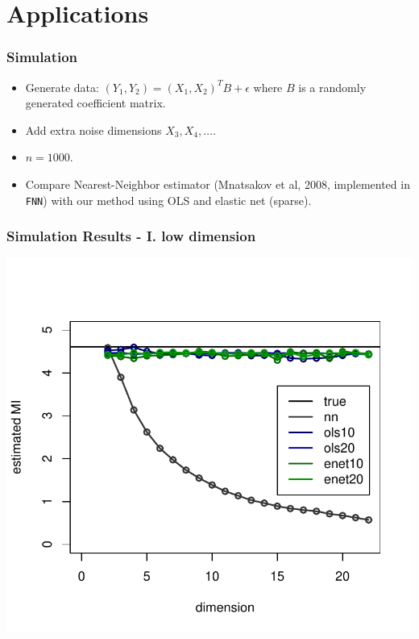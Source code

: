 \documentclass{beamer}
\begin{document}
\section{Applications}

\begin{frame}
\sectionpage
\end{frame}

\begin{frame}
\frametitle{Simulation}

\begin{itemize}
\item Generate data: $(Y_1, Y_2) = (X_1, X_2)^T B + \epsilon$ where $B$ is a randomly generated coefficient matrix.
\item Add extra noise dimensions $X_3, X_4, \hdots$.
\item $n = 1000$.
\item Compare Nearest-Neighbor estimator (Mnatsakov et al, 2008, implemented in {\tt FNN}) with our method using OLS and elastic net (sparse).
\end{itemize}

\end{frame}

\begin{frame}
\frametitle{Simulation Results - I. low dimension}
\begin{center}
\includegraphics[scale = 0.65]{../idloss/sim2a_fig1.pdf}
\end{center}
\end{frame}
\end{document}
